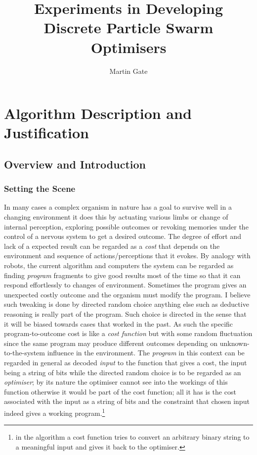 \documentclass[a4paper,oneside,english]{book}
\numberwithin{equation}{section}
\numberwithin{figure}{section}
\begin{document}
	\title{Experiments in Developing Discrete Particle Swarm Optimisers}
	\author{Martin Gate}
	\maketitle
	\tableofcontents\newpage
	
	\part[Algorithms]{Algorithm Description and Justification}
	\chapter{Overview and Introduction}
	\section{Setting the  Scene}
	In many cases a complex organism in nature has a goal to survive well in a changing environment it does this by actuating various limbs or change of internal perception, exploring possible outcomes or revoking memories under the control of a nervous system to get a desired outcome. The degree of effort and lack of a expected result  can be regarded as a \emph{cost} that depends on the  environment  and sequence of actions/perceptions  that it evokes. By analogy with robots, the current algorithm and computers the system can be regarded as finding  \emph{program}  fragments to give good results most of the time so that it can respond effortlessly to changes of environment. Sometimes the program gives an unexpected costly outcome and the organism must modify the program. I believe such tweaking is done by directed random choice anything else such as deductive reasoning is really part of the program. Such choice is directed in the sense that it will be biased towards cases that worked in the past. As such the  specific program-to-outcome cost is like a \emph{cost function } but with some random fluctuation since the  same program may produce different outcomes depending on unknown-to-the-system influence in the  environment. The \emph{program} in this context can be regarded in general as decoded  \emph{input} to the function that gives a cost, the input being a string of bits while the directed random choice is to be regarded as an \emph{optimiser}; by its nature the optimiser cannot see into the workings of this function otherwise it would be part of the cost function; all it has is the cost associated with the input as a string of bits and the constraint that chosen input indeed gives a working program.\footnote{ in the algorithm a cost function tries to convert an arbitrary binary string to a meaningful input and gives it back to the optimiser. }
	
\end{document}
